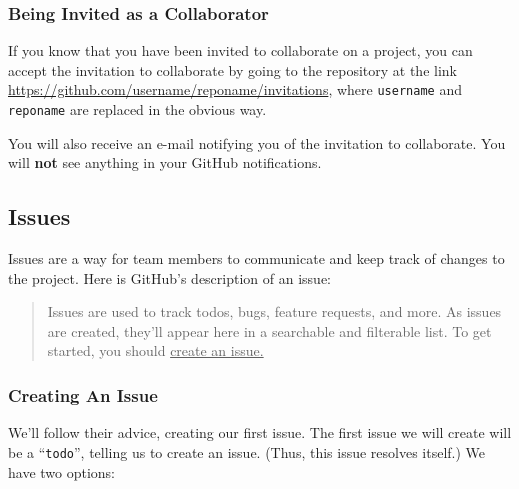 \documentclass[11pt]{article}
\begin{document}
\subsubsection{Being Invited as a Collaborator}

If you know that you have been invited to collaborate on a project, you can accept the invitation to collaborate by going to the repository at the link \url{https://github.com/username/reponame/invitations}, where \texttt{username} and \texttt{reponame} are replaced in the obvious way. 

You will also receive an e-mail notifying you of the invitation to collaborate. You will \textbf{not} see anything in your GitHub notifications. 

\subsection{Issues}

Issues are a way for team members to communicate and keep track of changes to the project.  Here is GitHub's description of an issue:~\cite{github-issues} \\

\begin{quote}
Issues are used to track todos, bugs, feature requests, and more. As issues are created, they'll appear here in a searchable and filterable list. To get started, you should \underline{create an issue.}
\end{quote} 

\subsubsection{Creating An Issue}
We'll follow their advice, creating our first issue. The first issue we will create will be a ``\texttt{todo}'', telling us to create an issue. (Thus, this issue resolves itself.) We have two options: 
\end{document}
